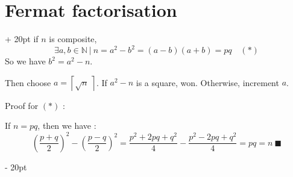 \documentclass[a4paper, 12pt, twoside]{article}
\newcommand{\N}{\mathbb{N}} %
\newcommand{\lr}[1]{\left( #1 \right)}
\newcommand{\ceil}[1]{\left\lceil #1 \right\rceil}
\newcommand{\ind}[1][20pt]{\advance\leftskip + #1}
\newcommand{\deind}[1][20pt]{\advance\leftskip - #1}
\newenvironment{indt}[2][20pt]{#2 \par \ind[#1]}{\par \deind} %
\begin{document}
    \begin{indt}{\section{Fermat factorisation}}
        if $n$ is composite,
        \[
            \exists a, b \in \N\ |\ n = a^2 - b^2 = (a - b)(a + b) = pq \quad (*)
        \]
        So we have $b^2 = a^2 - n$.

        Then choose $a = \ceil{\sqrt{n}\ }$. If $a^2 - n$ is a square, won. Otherwise, increment $a$.

        \vspace{12pt}
        
        Proof for $(*)$ :

        If $n = pq$, then we have :
        \[
            \lr{\dfrac{p + q}{2}}^2 - \lr{\dfrac{p - q}{2}}^2
            = \dfrac{p^2 + 2pq + q^2}{4} - \dfrac{p^2 - 2pq + q^2}{4}
            = pq = n\ \blacksquare
        \]
    \end{indt}

    \vspace{12pt}
    
\end{document}
